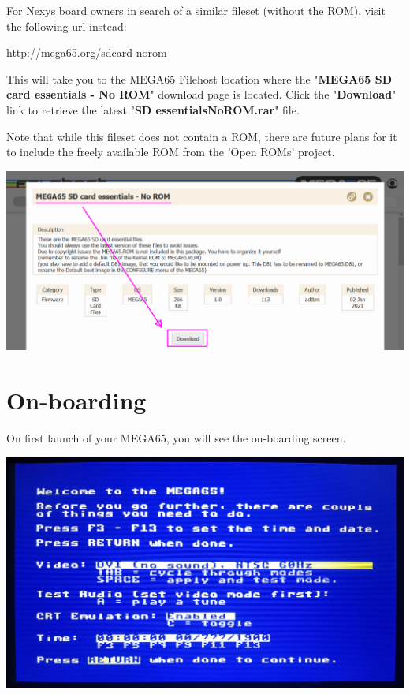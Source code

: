For Nexys board owners in search of a similar fileset (without the ROM), visit the following url instead:

\url{http://mega65.org/sdcard-norom}

This will take you to the MEGA65 Filehost location where the "\textbf{MEGA65 SD card essentials - No ROM}" download page is located. Click the "\textbf{Download}" link to retrieve the latest "\textbf{SD essentialsNoROM.rar}" file.

Note that while this fileset does not contain a ROM, there are future plans for it to include the freely available ROM from the 'Open ROMs' project.

\includegraphics[width=\linewidth]{images/latest_support_files.png}

\label{onboarding}
\section{On-boarding}

On first launch of your MEGA65, you will see the on-boarding screen.

\begin{center}
  \includegraphics[width=\linewidth]{images/img011_final_boot_01.jpg}
\end{center}

